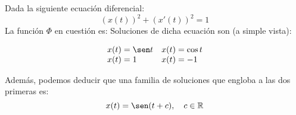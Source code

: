 \begin{ejemplo}
    Dada la siguiente ecuación diferencial:
    \begin{equation*}
        {(x(t))}^{2} + {(x'(t))}^{2} = 1
    \end{equation*}
    La función $\Phi$ en cuestión es:
    Soluciones de dicha ecuación son (a simple vista):

    \begin{equation*}
    \begin{array}{ll}
        x(t) = \sen t & x(t) = \cos t \\
        x(t) = 1 & x(t) = -1
    \end{array}
    \end{equation*}

    Además, podemos deducir que una familia de soluciones que engloba a las dos primeras es:
    \begin{equation*}
        x(t) = \sen(t+c), \quad c\in \mathbb{R}
    \end{equation*}

    \begin{center}
\end{center}
\end{ejemplo}
